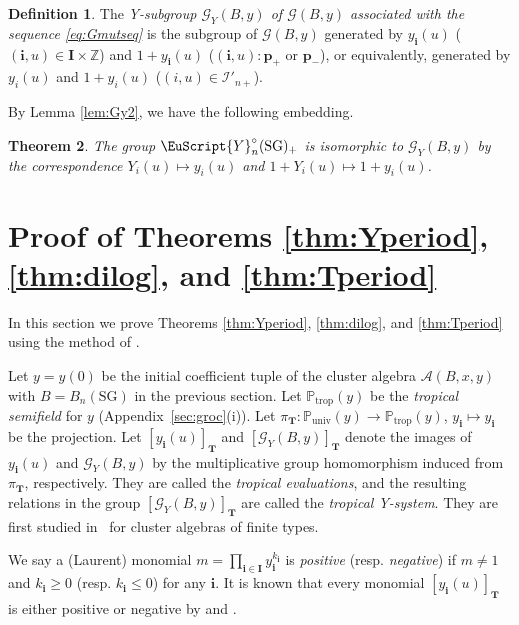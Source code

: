 \documentclass[pdftex]{sigma}
\numberwithin{equation}{section}
\newtheorem{Theorem}{Theorem}[section]
\theoremstyle{definition}
\newtheorem{Definition}[Theorem]{Definition}
\begin{document}
\begin{Definition}
The {\em Y-subgroup
$\mathcal{G}_Y(B,y)$
of $\mathcal{G}(B,y)$
associated with the sequence \eqref{eq:Gmutseq}}
is the subgroup of
$\mathcal{G}(B,y)$
generated by
$y_{\mathbf{i}}(u)$
($(\mathbf{i},u)\in \mathbf{I}\times \mathbb{Z}$)
and $1+y_{\mathbf{i}}(u)$
($(\mathbf{i},u):\mathbf{p}_+$ or $\mathbf{p}_-$),
or equivalently,
generated by
$y_i(u)$ and $1+y_i(u)$
($(i,u)\in \mathcal{I}'_{n+}$).
\end{Definition}

By Lemma \ref{lem:Gy2}, we have the following embedding.
\begin{Theorem}
\label{thm:GYiso}
The group $\EuScript{Y}^{\circ}_{n}(\mathrm{SG})_+$ is isomorphic to
$\mathcal{G}_Y(B,y)$ by the correspondence
$Y_i(u)\mapsto y_i(u)$
and $1+Y_i(u)\mapsto 1+y_i(u)$.
\end{Theorem}


\section{Proof of
Theorems \ref{thm:Yperiod}, \ref{thm:dilog},
and \ref{thm:Tperiod}}
\label{sec:proofSG}

In this section we prove
Theorems \ref{thm:Yperiod}, \ref{thm:dilog},
and \ref{thm:Tperiod}
using the method of \cite{Nakanishi09,Inoue10a}.


Let $y=y(0)$ be the initial coef\/f\/icient tuple
of the cluster algebra $\mathcal{A}(B,x,y)$
with $B=B_{n}(\mathrm{SG})$ in the previous section.
Let
$\mathbb{P}_{\mathrm{trop}}(y)$ be
the {\em tropical semifield} for $y$ (Appendix~\ref{sec:groc}(i)).
Let $\pi_{\mathbf{T}}:
\mathbb{P}_{\mathrm{univ}}(y)\rightarrow
\mathbb{P}_{\mathrm{trop}}(y)$, $y_{\mathbf{i}}\mapsto
y_{\mathbf{i}}$ be the projection.
Let $[y_{\mathbf{i}}(u)]_{\mathbf{T}}$
and $[\mathcal{G}_Y(B,y)]_{\mathbf{T}}$
denote the images of $y_{\mathbf{i}}(u)$
and $\mathcal{G}_Y(B,y)$
by the multiplicative group
 homomorphism induced from $\pi_{\mathbf{T}}$, respectively.
They are called the {\em tropical evaluations},
and the resulting relations in
the group $[\mathcal{G}_Y(B,y)]_{\mathbf{T}}$
are called the {\em tropical Y-system}.
They are f\/irst studied in~\cite{Fomin03b}
for cluster algebras of f\/inite types.

We say a (Laurent) monomial $m=\prod_{\mathbf{i}\in \mathbf{I}}
y_{\mathbf{i}}^{k_{\mathbf{i}}}$
is {\em positive} (resp. {\em negative})
if $m\neq 1$ and $k_{\mathbf{i}}\geq 0$
(resp. $k_{\mathbf{i}}\leq 0$)
for any $\mathbf{i}$.
It is known that every monomial $[y_{\mathbf{i}}(u)]_{\mathbf{T}}$
is either positive or negative by \cite[Proposition 5.6]{Fomin07}
and \cite[Theorem 1.7]{Derksen10}.
\end{document}
